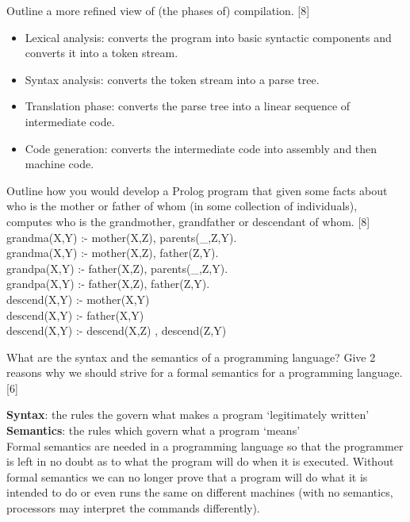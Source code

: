 \documentclass[grid,avery5388]{flashcards}
\begin{document}
\begin{flashcard}[]{Outline a more refined view of (the phases of) compilation. [8]}
\begin{itemize}

\item Lexical analysis: converts the program into basic syntactic components and converts it into a token stream.
\item Syntax analysis: converts the token stream into a parse tree.
\item Translation phase: converts the parse tree into a linear sequence of intermediate code.
\item Code generation: converts the intermediate code into assembly and then machine code.
\end{itemize}
\end{flashcard}

\begin{flashcard}[]{Outline how you would develop a Prolog program that given some facts about who is the mother or father of whom (in some collection of individuals),
computes who is the grandmother, grandfather or descendant of whom. [8]}
grandma(X,Y) :- mother(X,Z), parents(\_,Z,Y).\\ 
grandma(X,Y) :- mother(X,Z), father(Z,Y).\\ 
grandpa(X,Y) :- father(X,Z), parents(\_,Z,Y). \\
grandpa(X,Y) :- father(X,Z), father(Z,Y). \\
descend(X,Y) :- mother(X,Y)\\
descend(X,Y) :- father(X,Y)\\
descend(X,Y) :- descend(X,Z) , descend(Z,Y)\\
\end{flashcard}

\begin{flashcard}[]{What are the syntax and the semantics of a programming language?
Give 2 reasons why we should strive for a formal semantics for a programming
language. [6]}

\textbf{Syntax}: the rules the govern what makes a program ‘legitimately written’\\
\textbf{Semantics}: the rules which govern what a program ‘means’\\
Formal semantics are needed in a programming language so that the programmer is left in no doubt as to what the program will do when it is executed. Without formal semantics we can no longer prove that a program will do what it is intended to do or even runs the same on different machines (with no semantics, processors may interpret the commands differently).


\end{flashcard}
\end{document}
